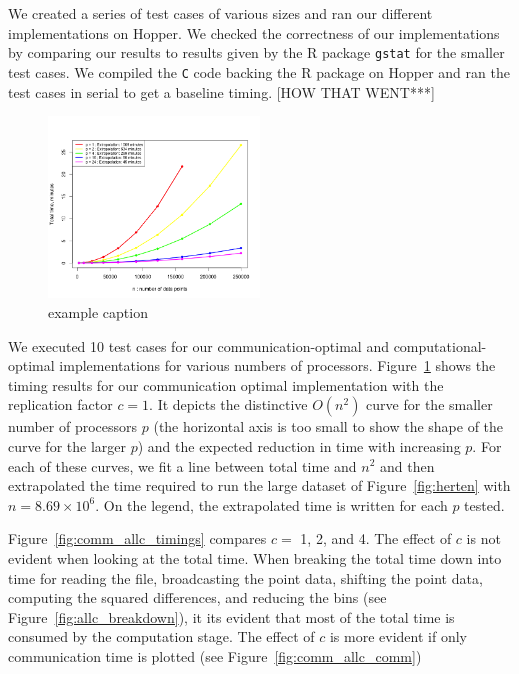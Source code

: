 
We created a series of test cases of various sizes and ran our different implementations on Hopper. We checked the correctness of our implementations by comparing our results to results given by the R package \texttt{gstat} \cite{Pebesma} for the smaller test cases. We compiled the \texttt{C} code backing the R package on Hopper and ran the test cases in serial to get a baseline timing. [HOW THAT WENT***]

\begin{figure}[!ht]
   \centering
   \includegraphics[width=0.5\textwidth]{./fig/comm_c1_timings.png} %
   \caption{example caption}
   \label{fig:comm_c1_timings}
\end{figure}

We executed 10 test cases for our communication-optimal and computational-optimal implementations for various numbers of processors. Figure~\ref{fig:comm_c1_timings} shows the timing results for our communication optimal implementation with the replication factor $c=1$. It depicts the distinctive $O(n^2)$ curve for the smaller number of processors $p$ (the horizontal axis is too small to show the shape of the curve for the larger $p$) and the expected reduction in time with increasing $p$. For each of these curves, we fit a line between total time and $n^2$ and then extrapolated the time required to run the large dataset of Figure~\ref{fig:herten} with $n=8.69\times10^6$. On the legend, the extrapolated time is written for each $p$ tested.  

Figure~\ref{fig:comm_allc_timings} compares $c=$ 1, 2, and 4. The effect of $c$ is not evident when looking at the total time. When breaking the total time down into time for reading the file, broadcasting the point data, shifting the point data, computing the squared differences, and reducing the bins (see Figure~\ref{fig:allc_breakdown}), it its evident that most of the total time is consumed by the computation stage. The effect of $c$ is more evident if only communication time is plotted (see Figure~\ref{fig:comm_allc_comm})

